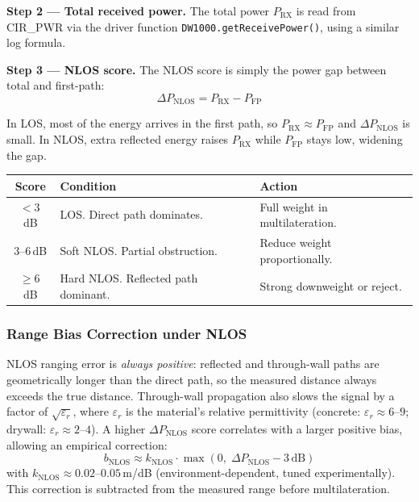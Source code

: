 \documentclass[11pt,a4paper]{article}
\begin{document}
\textbf{Step 2 --- Total received power.} The total power $P_\text{RX}$ is read from CIR\_PWR via the driver function \texttt{DW1000.getReceivePower()}, using a similar log formula.

\textbf{Step 3 --- NLOS score.} The NLOS score is simply the power gap between total and first-path:
\begin{equation}
\boxed{
\Delta P_\text{NLOS} = P_\text{RX} - P_\text{FP}
}
\label{eq:nlos}
\end{equation}

In LOS, most of the energy arrives in the first path, so $P_\text{RX} \approx P_\text{FP}$ and $\Delta P_\text{NLOS}$ is small. In NLOS, extra reflected energy raises $P_\text{RX}$ while $P_\text{FP}$ stays low, widening the gap.

\begin{center}
\begin{tabular}{cll}
\toprule
\textbf{Score} & \textbf{Condition} & \textbf{Action} \\
\midrule
$< 3$\,dB & LOS. Direct path dominates. & Full weight in multilateration. \\
$3$--$6$\,dB & Soft NLOS. Partial obstruction. & Reduce weight proportionally. \\
$\geq 6$\,dB & Hard NLOS. Reflected path dominant. & Strong downweight or reject. \\
\bottomrule
\end{tabular}
\end{center}

\subsubsection{Range Bias Correction under NLOS}

NLOS ranging error is \emph{always positive}: reflected and through-wall paths are geometrically longer than the direct path, so the measured distance always exceeds the true distance. Through-wall propagation also slows the signal by a factor of $\sqrt{\varepsilon_r}$, where $\varepsilon_r$ is the material's relative permittivity (concrete: $\varepsilon_r \approx 6$--$9$; drywall: $\varepsilon_r \approx 2$--$4$). A higher $\Delta P_\text{NLOS}$ score correlates with a larger positive bias, allowing an empirical correction:
\begin{equation}
b_\text{NLOS} \approx k_\text{NLOS} \cdot \max\!\left(0,\; \Delta P_\text{NLOS} - 3\,\text{dB}\right)
\label{eq:biasnlos}
\end{equation}
with $k_\text{NLOS} \approx 0.02$--$0.05$\,m/dB (environment-dependent, tuned experimentally). This correction is subtracted from the measured range before multilateration.
\end{document}

